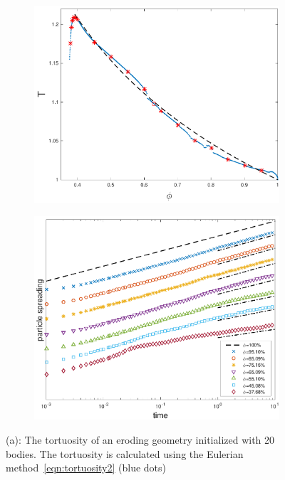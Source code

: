 \documentclass[preprint,10pt]{elsarticle}
\begin{document}
\begin{figure}[H]
\begin{subfigure}[b]{0.5\textwidth}
\includegraphics*[height = 0.8\linewidth]{./figs/tort_eulerian}
\caption{}
\end{subfigure}
\begin{subfigure}[b]{0.5\textwidth}
\includegraphics*[height = 0.8\linewidth]{./figs/20b_second_moment_long_ref}
\caption{}
\end{subfigure}
\caption{\label{fig:Eroding20Transport} (a): The tortuosity of an
eroding geometry initialized with 20 bodies.  The tortuosity is
calculated using the Eulerian method~\eqref{eqn:tortuosity2} (blue dots)
}
\end{figure}
\end{document}
